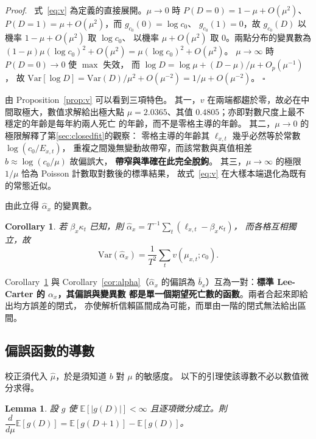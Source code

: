 \documentclass[UTF8, fontset=macnew, a4paper, 12pt]{ctexart}
\newtheorem{cor}{Corollary}
\newtheorem{lem}{Lemma}
\newenvironment{proof}{\par\noindent\textit{Proof}.\ }{\hfill$\square$\par\vspace{4pt}}
\newcommand{\Ex}{\mathbb{E}}
\begin{document}
\begin{proof}
式~\eqref{eq:v} 為定義的直接展開。$\mu\to0$ 時
$P(D=0)=1-\mu+O(\mu^2)$、$P(D=1)=\mu+O(\mu^2)$，而 $g_{c_0}(0)=\log c_0$、
$g_{c_0}(1)=0$，故 $g_{c_0}(D)$ 以機率 $1-\mu+O(\mu^2)$ 取 $\log c_0$、
以機率 $\mu+O(\mu^2)$ 取 $0$。兩點分布的變異數為
$(1-\mu)\mu(\log c_0)^2+O(\mu^2)=\mu(\log c_0)^2+O(\mu^2)$。
$\mu\to\infty$ 時 $P(D=0)\to0$ 使 $\max$ 失效，
而 $\log D=\log\mu+(D-\mu)/\mu+O_p(\mu^{-1})$，
故 $\mathrm{Var}[\log D]=\mathrm{Var}(D)/\mu^2+O(\mu^{-2})=1/\mu+O(\mu^{-2})$。
\end{proof}

由 Proposition~\ref{prop:v} 可以看到三項特色。
其一，$v$ 在兩端都趨於零，故必在中間取極大，數值求解給出極大點
$\mu=2.0365$、其值 $0.4805$；亦即對數尺度上最不穩定的年齡是每年約兩人死亡
的年齡，而不是零格主導的年齡。
其二，$\mu\to0$ 的極限解釋了第\ref{sec:closedfit}的觀察：
零格主導的年齡其 $\ell_{x,t}$ 幾乎必然等於常數 $\log(c_0/E_{x,t})$，
重複之間幾無變動故帶窄，而該常數與真值相差 $b\approx\log(c_0/\mu)$ 故偏誤大，
\textbf{帶窄與準確在此完全脫鉤}。
其三，$\mu\to\infty$ 的極限 $1/\mu$ 恰為 Poisson 計數取對數後的標準結果，
故式~\eqref{eq:v} 在大樣本端退化為既有的常態近似。

由此立得 $\hat\alpha_x$ 的變異數。

\begin{cor}\label{cor:var}
若 $\beta_x\kappa_t$ 已知，則 $\hat\alpha_x=T^{-1}\sum_t(\ell_{x,t}-\beta_x\kappa_t)$，
而各格互相獨立，故
\begin{equation}\label{eq:valpha}
\mathrm{Var}(\hat\alpha_x)=\frac{1}{T^{2}}\sum_{t}v(\mu_{x,t};c_0).
\end{equation}
\end{cor}

Corollary~\ref{cor:var} 與 Corollary~\ref{cor:alpha}（$\hat\alpha_x$ 的偏誤為
$\bar b_x$）互為一對：\textbf{標準 Lee-Carter 的 $\alpha_x$，其偏誤與變異數
都是單一個期望死亡數的函數}。兩者合起來即給出均方誤差的閉式，
亦使解析信賴區間成為可能，而單由一階的閉式無法給出區間。

\subsection{偏誤函數的導數}\label{subsec:bderiv}

校正須代入 $\hat\mu$，於是須知道 $b$ 對 $\mu$ 的敏感度。
以下的引理使該導數不必以數值微分求得。

\begin{lem}\label{lem:diff}
設 $g$ 使 $\Ex[|g(D)|]<\infty$ 且逐項微分成立。則
$\dfrac{d}{d\mu}\Ex[g(D)]=\Ex[g(D{+}1)]-\Ex[g(D)]$。
\end{lem}
\end{document}
